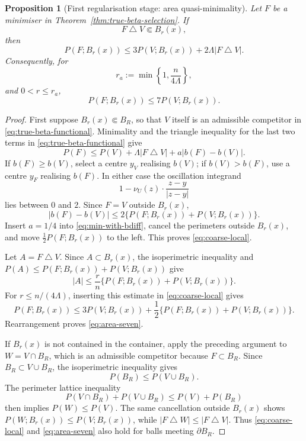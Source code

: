 \documentclass[11pt]{amsart}
\newtheorem{proposition}[theorem]{Proposition}
\theoremstyle{definition}
\newcommand{\Per}{P}
\begin{document}
\begin{proposition}[First regularisation stage: area quasi-minimality]
\label{prop:area-quasi}
Let \(F\) be a minimiser in Theorem~\ref{thm:true-beta-selection}.  If
\[
   F\mathbin{\triangle}V\Subset B_r(x),
\tag{4.62}\label{eq:beta-local-comp}
\]
then
\[
   \Per(F;B_r(x))
   \le3\Per(V;B_r(x))
        +2\Lambda|F\mathbin{\triangle}V|.
\tag{4.63}\label{eq:coarse-local}
\]
Consequently, for
\[
   r_a:=\min\left\{1,\frac{n}{4\Lambda}\right\},
\tag{4.64}\label{eq:ra}
\]
and \(0<r\le r_a\),
\[
   \Per(F;B_r(x))\le7\Per(V;B_r(x)).
\tag{4.65}\label{eq:area-seven}
\]
\end{proposition}

\begin{proof}
First suppose \(B_r(x)\Subset B_R\), so that \(V\) itself is an
admissible competitor in \eqref{eq:true-beta-functional}.
Minimality and the triangle inequality for the last two terms in
\eqref{eq:true-beta-functional} give
\[
   \Per(F)\le\Per(V)+\Lambda|F\mathbin{\triangle}V|
                  +a|b(F)-b(V)|.
\tag{4.66}\label{eq:min-with-bdiff}
\]
If \(b(F)\ge b(V)\), select a centre \(y_V\) realising \(b(V)\);
if \(b(V)>b(F)\), use a centre \(y_F\) realising \(b(F)\).  In either
case the oscillation integrand
\[
   1-\nu_U(z)\cdot\frac{z-y}{|z-y|}
\]
lies between \(0\) and \(2\).  Since \(F=V\) outside \(B_r(x)\),
\[
   |b(F)-b(V)|
   \le2\{\Per(F;B_r(x))+\Per(V;B_r(x))\}.
\tag{4.67}\label{eq:b-local-coarse}
\]
Insert \(a=1/4\) into \eqref{eq:min-with-bdiff}, cancel the
perimeters outside \(B_r(x)\), and move
\(\frac12\Per(F;B_r(x))\) to the left.  This proves
\eqref{eq:coarse-local}.

Let \(A=F\mathbin{\triangle}V\).  Since \(A\subset B_r(x)\), the
isoperimetric inequality and \(P(A)\le\Per(F;B_r(x))+\Per(V;B_r(x))\)
give
\[
   |A|\le\frac r n
       \{\Per(F;B_r(x))+\Per(V;B_r(x))\}.
\tag{4.68}\label{eq:A-perimeters}
\]
For \(r\le n/(4\Lambda)\), inserting this estimate in
\eqref{eq:coarse-local} gives
\[
   \Per(F;B_r(x))
   \le3\Per(V;B_r(x))
      +\frac12\{\Per(F;B_r(x))+\Per(V;B_r(x))\}.
\]
Rearrangement proves \eqref{eq:area-seven}.

If \(B_r(x)\) is not contained in the container, apply the preceding
argument to \(W=V\cap B_R\), which is an admissible competitor because
\(F\subset B_R\).  Since \(B_R\subset V\cup B_R\), the isoperimetric
inequality gives
\[
   \Per(B_R)\le\Per(V\cup B_R).
\]
The perimeter lattice inequality
\[
   \Per(V\cap B_R)+\Per(V\cup B_R)
      \le\Per(V)+\Per(B_R)
\]
then implies \(\Per(W)\le\Per(V)\).  The same cancellation outside
\(B_r(x)\) shows \(\Per(W;B_r(x))\le\Per(V;B_r(x))\), while
\(|F\mathbin{\triangle}W|\le|F\mathbin{\triangle}V|\).
Thus \eqref{eq:coarse-local} and \eqref{eq:area-seven} also hold for
balls meeting \(\partial B_R\).
\end{proof}
\end{document}
